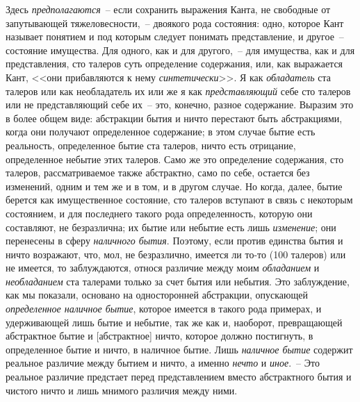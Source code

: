 Здесь \emph{предполагаются}~-- если сохранить выражения
Канта, не свободные от запутывающей тяжеловесности,~--
двоякого рода состояния: одно, которое Кант называет
понятием и под которым следует понимать представление,
и другое~-- состояние имущества. Для одного, как и
для другого,~-- для имущества, как и для представления,
сто талеров суть определение содержания, или, как
выражается Кант, <<они прибавляются к нему \emph{синтетически}>>.
Я как \emph{обладатель} ста талеров или как необладатель
их или же я как \emph{представляющий} себе сто талеров
или не представляющий себе их~-- это, конечно, разное
содержание. Выразим это в более общем виде:
абстракции бытия и ничто перестают быть абстракциями,
когда они получают определенное содержание; в этом
случае бытие есть реальность, определенное бытие ста
талеров, ничто есть отрицание, определенное небытие
этих талеров. Само же это определение содержания, сто
талеров, рассматриваемое также абстрактно, само по себе,
остается без изменений, одним и тем же и в том, и в другом
случае. Но когда, далее, бытие берется как имущественное
состояние, сто талеров вступают в связь с некоторым
состоянием, и для последнего такого рода определенность,
которую они составляют, не безразлична; их
бытие или небытие есть лишь \emph{изменение}; они перенесены
в сферу \emph{наличного бытия}. Поэтому, если против
единства бытия и ничто возражают, что, мол, не безразлично,
имеется ли то-то (100 талеров) или не имеется,
то заблуждаются, относя различие между моим \emph{обладанием}
и \emph{необладанием} ста талерами только за счет бытия
или небытия. Это заблуждение, как мы показали, основано
на односторонней абстракции, опускающей \emph{определенное
наличное бытие}, которое имеется в такого рода
примерах, и удерживающей лишь бытие и небытие, так
же как и, наоборот, превращающей абстрактное бытие
и [абстрактное] ничто, которое должно постигнуть, в определенное
бытие и ничто, в наличное бытие. Лишь \emph{наличное
бытие} содержит реальное различие между бытием
и ничто, а именно \emph{нечто} и \emph{иное}.~-- Это реальное различие
предстает перед представлением вместо абстрактного
бытия и чистого ничто и лишь мнимого различия между
ними.

